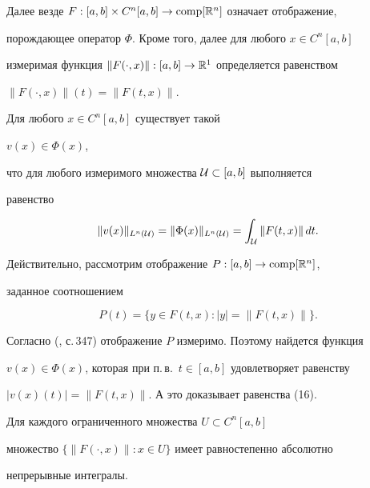 Далее везде $F:[a,b]\times C^n[a,b]\to\operatorname{comp}[\Bbb R^n]$ означает отображение,


порождающее оператор $\Phi$. Кроме того, далее для любого $x\in C^n[a,b]$


измеримая функция $\|F(\cdot,x)\|:[a,b]\to\Bbb R^1$ определяется равенством


$\|F(\cdot,x)\|(t)=\|F(t,x)\|$.





\begin{lem} Для любого $x\in C^n[a,b]$ существует такой


$v(x)\in\Phi(x)$,


что для любого измеримого множества ${\cal U}\subset [a,b]$ выполняется


равенство


\begin{equation}


\|v(x)\|_{L^n(\cal U)}=\|\Phi(x)\|_{L^n(\cal U)}=


\int_{\cal U}\|F(t,x)\|\,dt.


\end{equation}


\end{lem}





Действительно, рассмотрим отображение $P:[a,b]\to\operatorname{comp}[\Bbb R^n]$,


заданное соотношением


$$


P(t)=\{y\in F(t,x): |y|=\|F(t,x)\|\}.


$$


Согласно (\cite{7}, с.\,347) отображение $P$ измеримо. Поэтому найдется функция


$v(x)\in\Phi(x)$, которая при п.\,в.~$t\in[a,b]$ удовлетворяет равенству


$|v(x)(t)|=\|F(t,x)\|$. А это доказывает равенства (16).





\begin{cor} Для каждого ограниченного множества $U\subset C^n[a,b]$


множество $\{\|F(\cdot,x)\|:x\in U\}$ имеет равностепенно абсолютно


непрерывные интегралы.


\end{cor}





